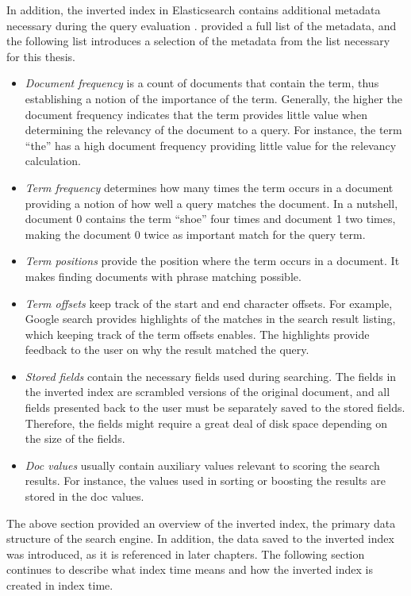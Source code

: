 In addition, the inverted index in Elasticsearch contains additional metadata necessary during the query evaluation
\cite{relevantSearch}. 
\citeauthor{relevantSearch} \cite{relevantSearch} provided a full list of the metadata, and
the following list introduces a selection of the metadata from the list necessary for this thesis.
\begin{itemize}
    \item \emph{Document frequency} is a count of documents that contain the term, thus 
    establishing a notion of the importance of the term. 
    Generally, the higher the document frequency indicates that the term provides little value when 
    determining the relevancy of the document to a query.
    For instance, the term \enquote{the} has a high document frequency providing little value 
    for the relevancy calculation.
    \item \emph{Term frequency} determines how many times the term occurs in a document
    providing a notion of how well a query matches the document.
    In a nutshell, document 0 contains the term \enquote{shoe} four times and document 1 two times,
    making the document 0 twice as important match for the query term.
    \item \emph{Term positions} provide the position where the term occurs in a document. 
    It makes finding documents with phrase matching possible.
    \item \emph{Term offsets} keep track of the start and end character offsets. 
    For example, Google search provides highlights of the matches in the search result listing,
    which keeping track of the term offsets enables.
    The highlights provide feedback to the user on why the result matched the query.
    \item \emph{Stored fields} contain the necessary fields used during searching. 
    The fields in the inverted index are scrambled versions of the original document, and all fields 
    presented back to the user must be separately saved to the stored fields.
    Therefore, the fields might require a great deal of disk space depending on the size of the fields.
    \item \emph{Doc values} usually contain auxiliary values relevant to scoring the search results.
    For instance, the values used in sorting or boosting the results are stored in the doc values.
\end{itemize}

The above section provided an overview of the inverted index, the primary data structure of the search engine.
In addition, the data saved to the inverted index was introduced, as it is referenced in later chapters.
The following section continues to describe what index time means and how the inverted index is 
created in index time.

